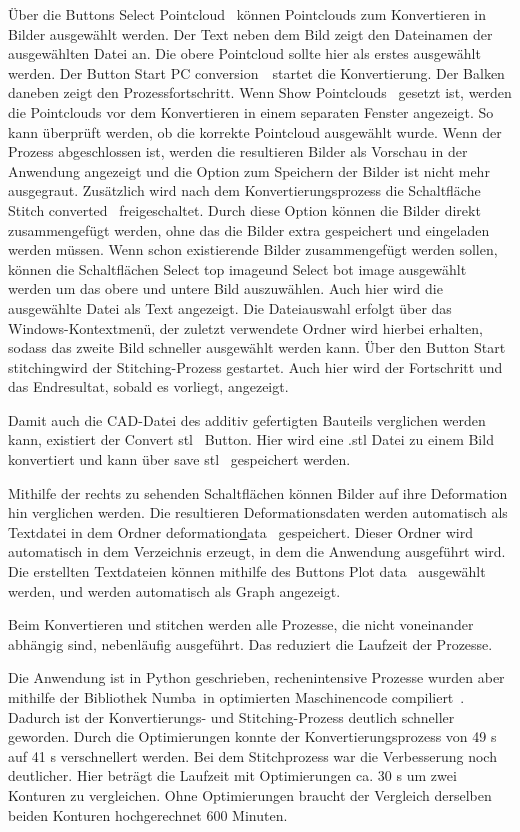 Über die Buttons \glqq Select Pointcloud\grqq~ können Pointclouds zum Konvertieren in Bilder
ausgewählt werden. Der Text neben dem Bild zeigt den Dateinamen der ausgewählten 
Datei an. Die obere Pointcloud sollte hier als erstes ausgewählt werden.
Der Button \glqq Start PC conversion\grqq~~startet die Konvertierung. Der Balken 
daneben zeigt den Prozessfortschritt. 
Wenn \glqq Show Pointclouds\grqq~ gesetzt ist, werden die Pointclouds vor dem 
Konvertieren in einem separaten Fenster angezeigt. So kann überprüft werden, ob die 
korrekte Pointcloud ausgewählt wurde.
Wenn der Prozess abgeschlossen ist, werden die resultieren Bilder als Vorschau in der 
Anwendung angezeigt und die Option zum Speichern der Bilder ist nicht mehr ausgegraut.
Zusätzlich wird nach dem Konvertierungsprozess die Schaltfläche 
\glqq Stitch converted\grqq~ freigeschaltet. Durch diese Option können die 
Bilder direkt zusammengefügt werden, ohne das die Bilder extra gespeichert und 
eingeladen werden müssen. Wenn schon existierende Bilder zusammengefügt werden sollen, 
können die Schaltflächen \glqq Select top image\grqq und \glqq Select bot image\grqq
ausgewählt werden um das obere und untere Bild auszuwählen. Auch hier wird die 
ausgewählte Datei als Text angezeigt. Die Dateiauswahl erfolgt über das 
Windows-Kontextmenü, der zuletzt verwendete Ordner wird hierbei erhalten, sodass das 
zweite Bild schneller ausgewählt werden kann. 
Über den Button \glqq Start stitching\grqq wird der Stitching-Prozess gestartet. 
Auch hier wird der Fortschritt und das Endresultat, sobald es vorliegt, angezeigt.

Damit auch die CAD-Datei des additiv gefertigten Bauteils verglichen werden kann, 
existiert der \glqq Convert stl\grqq~ Button. Hier wird eine .stl Datei zu einem Bild 
konvertiert und kann über \glqq save stl\grqq~ gespeichert werden.

Mithilfe der rechts zu sehenden Schaltflächen können Bilder auf ihre Deformation hin 
verglichen werden. Die resultieren Deformationsdaten werden automatisch als Textdatei
in dem Ordner \glqq deformation\underline data\grqq~ gespeichert. Dieser Ordner wird automatisch 
in dem Verzeichnis erzeugt, in dem die Anwendung ausgeführt wird. 
Die erstellten Textdateien können mithilfe des Buttons \glqq Plot data\grqq~ ausgewählt 
werden, und werden automatisch als Graph angezeigt. 

Beim Konvertieren und stitchen werden alle Prozesse, die nicht voneinander abhängig sind,  
nebenläufig ausgeführt. Das reduziert die Laufzeit der Prozesse.

Die Anwendung ist in Python geschrieben, rechenintensive Prozesse wurden aber mithilfe 
der Bibliothek \glqq Numba\grqq~in optimierten Maschinencode compiliert~\cite{numba}.
Dadurch ist der Konvertierungs- und Stitching-Prozess deutlich schneller geworden. 
Durch die Optimierungen konnte der Konvertierungsprozess von 49 s auf 41 s verschnellert 
werden. Bei dem Stitchprozess war die Verbesserung noch deutlicher. Hier 
beträgt die Laufzeit mit Optimierungen ca. 30 s um zwei Konturen zu vergleichen. 
Ohne Optimierungen braucht der Vergleich derselben beiden Konturen 
hochgerechnet 600 Minuten.



